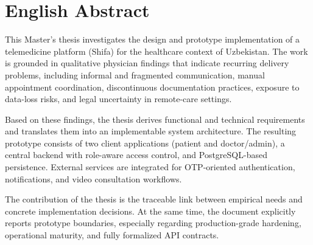\chapter*{English Abstract}

This Master's thesis investigates the design and prototype implementation of a telemedicine platform (Shifa) for the healthcare context of Uzbekistan. The work is grounded in qualitative physician findings that indicate recurring delivery problems, including informal and fragmented communication, manual appointment coordination, discontinuous documentation practices, exposure to data-loss risks, and legal uncertainty in remote-care settings.

Based on these findings, the thesis derives functional and technical requirements and translates them into an implementable system architecture. The resulting prototype consists of two client applications (patient and doctor/admin), a central backend with role-aware access control, and PostgreSQL-based persistence. External services are integrated for OTP-oriented authentication, notifications, and video consultation workflows.

The contribution of the thesis is the traceable link between empirical needs and concrete implementation decisions. At the same time, the document explicitly reports prototype boundaries, especially regarding production-grade hardening, operational maturity, and fully formalized API contracts.
